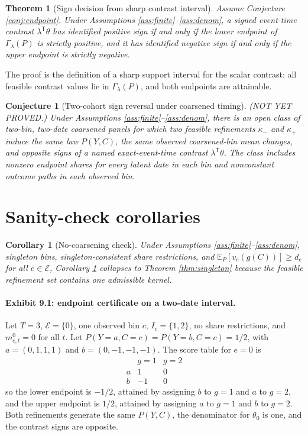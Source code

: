 \documentclass[11pt]{article}
\newcommand{\E}{\mathbb{E}}
\newcommand{\transpose}{\mathsf{T}}
\theoremstyle{definition}
\theoremstyle{plain}
\newtheorem{theorem}{Theorem}
\newtheorem{conjecture}{Conjecture}
\newtheorem{corollary}{Corollary}
\theoremstyle{remark}
\begin{document}
\begin{theorem}[Sign decision from sharp contrast interval]\label{thm:sign}
Assume Conjecture \ref{conj:endpoint}. Under Assumptions \ref{ass:finite}--\ref{ass:denom}, a signed event-time contrast \(\lambda^\transpose\theta\) has identified positive sign if and only if the lower endpoint of \(\Gamma_\lambda(P)\) is strictly positive, and it has identified negative sign if and only if the upper endpoint is strictly negative.
\end{theorem}
The proof is the definition of a sharp support interval for the scalar contrast: all feasible contrast values lie in \(\Gamma_\lambda(P)\), and both endpoints are attainable.

\begin{conjecture}[Two-cohort sign reversal under coarsened timing]\label{conj:reversal}
(NOT YET PROVED.) Under Assumptions \ref{ass:finite}--\ref{ass:denom}, there is an open class of two-bin, two-date coarsened panels for which two feasible refinements \(\kappa_-\) and \(\kappa_+\) induce the same law \(P(Y,C)\), the same observed coarsened-bin mean changes, and opposite signs of a named exact-event-time contrast \(\lambda^\transpose\theta\). The class includes nonzero endpoint shares for every latent date in each bin and nonconstant outcome paths in each observed bin.
\end{conjecture}

\section{Sanity-check corollaries}
\begin{corollary}[No-coarsening check]\label{cor:nocoarsening}
Under Assumptions \ref{ass:finite}--\ref{ass:denom}, singleton bins, singleton-consistent share restrictions, and \(\E_P[v_e(g(C))]\ge d_e\) for all \(e\in\mathcal E\), Corollary \ref{cor:nocoarsening} collapses to Theorem \ref{thm:singleton} because the feasible refinement set contains one admissible kernel.
\end{corollary}

\paragraph{Exhibit 9.1: endpoint certificate on a two-date interval.}
Let \(T=3\), \(\mathcal E=\{0\}\), one observed bin \(c\), \(I_c=\{1,2\}\), no share restrictions, and \(m^0_{c,t}=0\) for all \(t\). Let \(P(Y=a,C=c)=P(Y=b,C=c)=1/2\), with \(a=(0,1,1,1)\) and \(b=(0,-1,-1,-1)\). The score table for \(e=0\) is
\[
\begin{array}{c|cc}
&g=1&g=2\\ \hline
a&1&0\\
b&-1&0
\end{array}
\]
so the lower endpoint is \(-1/2\), attained by assigning \(b\) to \(g=1\) and \(a\) to \(g=2\), and the upper endpoint is \(1/2\), attained by assigning \(a\) to \(g=1\) and \(b\) to \(g=2\). Both refinements generate the same \(P(Y,C)\), the denominator for \(\theta_0\) is one, and the contrast signs are opposite.
\end{document}

